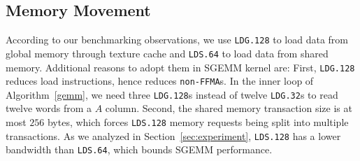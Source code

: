 \subsection{Memory Movement}
According to our benchmarking observations, we use {\tt LDG.128} to load data from global memory through texture cache
and {\tt LDS.64} to load data from shared memory.
Additional reasons to adopt them in SGEMM kernel are:
First, {\tt LDG.128} reduces load instructions, hence reduces {\tt non-FFMA}s. %
In the inner loop of Algorithm~\ref{gemm}, we need three {\tt LDG.128}s instead of twelve {\tt LDG.32}s to read twelve
words from a $A$ column. Second, the shared memory transaction size is at most
$256$ bytes, which forces {\tt LDS.128} memory requests being split into
multiple transactions.
As we analyzed in Section~\ref{sec:experiment}, {\tt LDS.128} has a lower bandwidth than {\tt LDS.64}, which bounds SGEMM performance.

